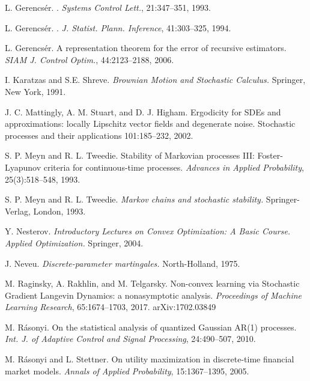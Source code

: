 \documentclass[a4paper]{article}
\begin{document}
\begin{thebibliography}{00}
 {L. Gerencs{\'e}r.}
.
\newblock\emph{Systems Control Lett.}, 21:347--351, 1993.

 {L. Gerencs{\'e}r.}
.
\newblock\emph{J. Statist. Plann. Inference}, 41:303--325, 1994.

 L. Gerencs\'er.
\newblock A representation theorem for the error of recursive estimators.
\newblock \emph{SIAM J. Control Optim.}, 44:2123--2188, 2006.


I. Karatzas and S.E. Shreve.
\newblock \emph{Brownian Motion and Stochastic Calculus.}
\newblock Springer, New York, 1991.


 J. C. Mattingly, A. M. Stuart, and D. J. Higham.
\newblock Ergodicity for SDEs and approximations: locally Lipschitz vector fields and degenerate noise.
\newblock Stochastic processes and their applications 101:185--232, 2002.

S. P. Meyn and R. L. Tweedie.
\newblock Stability of Markovian processes III: Foster-Lyapunov criteria for continuous-time processes.
\newblock \emph{Advances in Applied Probability}, 25(3):518--548, 1993.

S. P. Meyn and R. L. Tweedie.
\newblock \emph{Markov chains and stochastic stability.}
\newblock Springer-Verlag, London, 1993.

 Y. Nesterov.
\newblock\emph{Introductory Lectures on Convex Optimization: A Basic
Course. Applied Optimization.}
\newblock Springer, 2004.

 J. Neveu.
\newblock\emph{Discrete-parameter martingales.}
\newblock North-Holland, 1975.

M. Raginsky, A. Rakhlin, and M. Telgarsky.
\newblock Non-convex learning via Stochastic Gradient Langevin Dynamics: a nonasymptotic analysis.
\newblock \emph{Proceedings of Machine Learning Research}, 65:1674--1703, 2017. \newblock arXiv:1702.03849

 M. R\'asonyi.
\newblock On the statistical analysis of
quantized Gaussian AR(1) processes.
\newblock\emph{Int. J. of Adaptive Control and Signal Processing}, {24}:490--507, 2010.

 M. R\'asonyi and L. Stettner.
\newblock On utility maximization in discrete-time financial market models.
\newblock \emph{Annals of Applied Probability}, 15:1367--1395, 2005.


\end{thebibliography}
\end{document}
